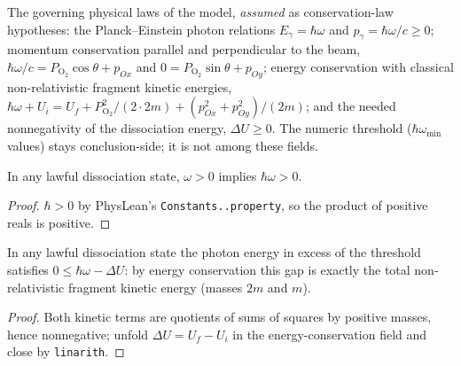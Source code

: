 \begin{definition}
\label{def:IPhO2026Problems_problem_IPhO_2026_1_C_2:IsOzonePhotodissociation}
The governing physical laws of the model, \emph{assumed} as conservation-law
hypotheses: the Planck--Einstein photon relations $E_\gamma = \hbar\omega$ and
$p_\gamma = \hbar\omega/c \ge 0$; momentum conservation parallel and
perpendicular to the beam,
$\hbar\omega/c = P_{\mathrm{O_2}}\cos\theta + p_{Ox}$ and
$0 = P_{\mathrm{O_2}}\sin\theta + p_{Oy}$; energy conservation with classical
non-relativistic fragment kinetic energies,
$\hbar\omega + U_i = U_f + P_{\mathrm{O_2}}^2/(2\cdot 2m) +
(p_{Ox}^2 + p_{Oy}^2)/(2m)$; and the needed nonnegativity of the
dissociation energy, $\Delta U \ge 0$.  The numeric threshold
($\hbar\omega_{\min}$ values) stays conclusion-side; it is not among these
fields.
\end{definition}

\begin{lemma}
\label{lem:IPhO2026Problems_problem_IPhO_2026_1_C_2:photon_energy_pos}
In any lawful dissociation state, $\omega > 0$ implies $\hbar\omega > 0$.
\end{lemma}
\begin{proof}
$\hbar > 0$ by PhysLean's \texttt{Constants.\hbar.property}, so the product of
positive reals is positive.
\end{proof}

\begin{lemma}
\label{lem:IPhO2026Problems_problem_IPhO_2026_1_C_2:rest_energy_gap_nonneg}
In any lawful dissociation state the photon energy in excess of the
threshold satisfies $0 \le \hbar\omega - \Delta U$: by energy conservation
this gap is exactly the total non-relativistic fragment kinetic energy
(masses $2m$ and $m$).
\end{lemma}
\begin{proof}
Both kinetic terms are quotients of sums of squares by positive masses, hence
nonnegative; unfold $\Delta U = U_f - U_i$ in the energy-conservation field
and close by \texttt{linarith}.
\end{proof}

